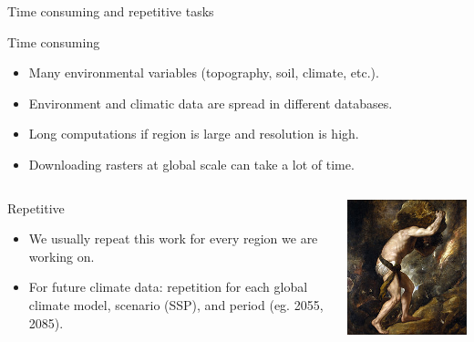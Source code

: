 \documentclass[10pt,table,dvipsnames,compress]{beamer}
\begin{document}
\begin{frame}[label={sec:orgdeb6c21}]{Time consuming and repetitive tasks}
\begin{block}{Time consuming}
\begin{itemize}
\item Many environmental variables (topography, soil, climate, etc.).
\item Environment and climatic data are spread in different databases.
\item Long computations if region is large and resolution is high.
\item Downloading rasters at global scale can take a lot of time.
\end{itemize}
\end{block}
\begin{columns}
\begin{column}{0.7\columnwidth}
\begin{block}{Repetitive}
\begin{itemize}
\item We usually repeat this work for every region we are working on.
\item For future climate data: repetition for each global climate model, scenario (SSP), and period (eg. 2055, 2085).
\end{itemize}
\end{block}
\end{column}
\begin{column}{0.3\columnwidth}
\begin{center}
\includegraphics[width=\textwidth]{figs/sisyph.jpg}
\end{center}
\end{column}
\end{columns}
\end{frame}
\end{document}
